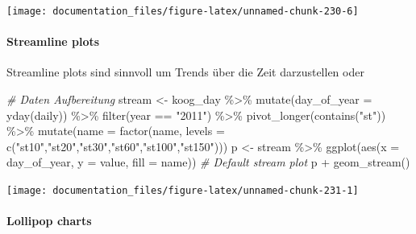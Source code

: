 \documentclass[
]{article}
\newenvironment{Shaded}{\begin{snugshade}}{\end{snugshade}}
\newcommand{\AttributeTok}[1]{\textcolor[rgb]{0.77,0.63,0.00}{#1}}
\newcommand{\CommentTok}[1]{\textcolor[rgb]{0.56,0.35,0.01}{\textit{#1}}}
\newcommand{\FunctionTok}[1]{\textcolor[rgb]{0.00,0.00,0.00}{#1}}
\newcommand{\NormalTok}[1]{#1}
\newcommand{\OtherTok}[1]{\textcolor[rgb]{0.56,0.35,0.01}{#1}}
\newcommand{\SpecialCharTok}[1]{\textcolor[rgb]{0.00,0.00,0.00}{#1}}
\newcommand{\StringTok}[1]{\textcolor[rgb]{0.31,0.60,0.02}{#1}}
\begin{document}
\begin{center}\texttt{[image: documentation\_files/figure-latex/unnamed-chunk-230-6]} \end{center}

\hypertarget{streamline-plots}{%
\paragraph{Streamline plots}\label{streamline-plots}}

Streamline plots sind sinnvoll um Trends über die Zeit darzustellen oder

\begin{Shaded}
\begin{Highlighting}[]
\CommentTok{\# Daten Aufbereitung}
\NormalTok{stream }\OtherTok{\textless{}{-}}\NormalTok{ koog\_day }\SpecialCharTok{\%\textgreater{}\%}
  \FunctionTok{mutate}\NormalTok{(}\AttributeTok{day\_of\_year =} \FunctionTok{yday}\NormalTok{(daily)) }\SpecialCharTok{\%\textgreater{}\%}
  \FunctionTok{filter}\NormalTok{(year }\SpecialCharTok{==} \StringTok{"2011"}\NormalTok{) }\SpecialCharTok{\%\textgreater{}\%}
  \FunctionTok{pivot\_longer}\NormalTok{(}\FunctionTok{contains}\NormalTok{(}\StringTok{"st"}\NormalTok{)) }\SpecialCharTok{\%\textgreater{}\%}
  \FunctionTok{mutate}\NormalTok{(}\AttributeTok{name =} \FunctionTok{factor}\NormalTok{(name, }\AttributeTok{levels =} \FunctionTok{c}\NormalTok{(}\StringTok{"st10"}\NormalTok{,}\StringTok{"st20"}\NormalTok{,}\StringTok{"st30"}\NormalTok{,}\StringTok{"st60"}\NormalTok{,}\StringTok{"st100"}\NormalTok{,}\StringTok{"st150"}\NormalTok{)))}
\NormalTok{p }\OtherTok{\textless{}{-}}\NormalTok{ stream }\SpecialCharTok{\%\textgreater{}\%}
  \FunctionTok{ggplot}\NormalTok{(}\FunctionTok{aes}\NormalTok{(}\AttributeTok{x =}\NormalTok{ day\_of\_year, }\AttributeTok{y =}\NormalTok{ value, }\AttributeTok{fill =}\NormalTok{ name))}
\CommentTok{\# Default stream plot}
\NormalTok{p }\SpecialCharTok{+} \FunctionTok{geom\_stream}\NormalTok{()}
\end{Highlighting}
\end{Shaded}

\begin{center}\texttt{[image: documentation\_files/figure-latex/unnamed-chunk-231-1]} \end{center}

\hypertarget{lollipop-charts}{%
\paragraph{Lollipop charts}\label{lollipop-charts}}
\end{document}
